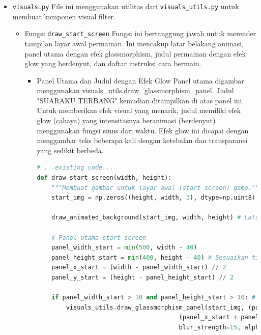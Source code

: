 \documentclass[11pt,a4paper]{article}
\begin{document}
\begin{itemize}
\begin{itemize}
\begin{itemize}
\begin{lstlisting}[language=Python, caption=Logika penambahan border dan inner glow]
        # Tambahkan inner glow (efek cahaya di dalam border)
        inner_overlay = img.copy()
        cv2.rectangle(inner_overlay, (x1+2, y1+2), (x2-2, y2-2), border_color_val, 1) # Border lebih tipis di dalam
        cv2.addWeighted(img, 0.9, inner_overlay, 0.1, 0, img) # Blend dengan alpha rendah
# ...existing code...
\end{lstlisting}
\end{itemize}
\end{itemize}
\item \texttt{visuals.py}
\newline File ini menggunakan utilitas dari \texttt{visuals\_utils.py} untuk membuat komponen visual filter.
\begin{itemize}
\item Fungsi \texttt{draw\_start\_screen}
\newline Fungsi ini bertanggung jawab untuk merender tampilan layar awal permainan. Ini mencakup latar belakang animasi, panel utama dengan efek glassmorphism, judul permainan dengan efek glow yang berdenyut, dan daftar instruksi cara bermain.
\begin{itemize}
\item Panel Utama dan Judul dengan Efek Glow
\newline Panel utama digambar menggunakan visuals\_utils.draw\_glassmorphism\_panel. Judul "SUARAKU TERBANG" kemudian ditampilkan di atas panel ini. Untuk memberikan efek visual yang menarik, judul memiliki efek glow (cahaya) yang intensitasnya beranimasi (berdenyut) menggunakan fungsi sinus dari waktu. Efek glow ini dicapai dengan menggambar teks beberapa kali dengan ketebalan dan transparansi yang sedikit berbeda.
\begin{lstlisting}[language=Python, caption=Panel utama dan judul]
# ...existing code...
def draw_start_screen(width, height):
    """Membuat gambar untuk layar awal (start screen) game."""
    start_img = np.zeros((height, width, 3), dtype=np.uint8) # Latar hitam
    
    draw_animated_background(start_img, width, height) # Latar belakang animasi
    
    # Panel utama start screen
    panel_width_start = min(500, width - 40)
    panel_height_start = min(400, height - 40) # Sesuaikan tinggi jika perlu
    panel_x_start = (width - panel_width_start) // 2
    panel_y_start = (height - panel_height_start) // 2
    
    if panel_width_start > 10 and panel_height_start > 10: # Pastikan panel valid
        visuals_utils.draw_glassmorphism_panel(start_img, (panel_x_start, panel_y_start), 
                                       (panel_x_start + panel_width_start, panel_y_start + panel_height_start), 
                                       blur_strength=15, alpha=0.4)
    

\end{lstlisting}
\end{itemize}
\end{itemize}
\end{itemize}
\end{document}
